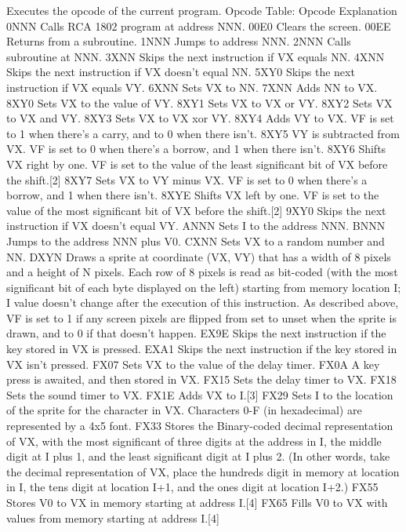 Executes the opcode of the current program. Opcode Table\-: Opcode Explanation 0\-N\-N\-N Calls R\-C\-A 1802 program at address N\-N\-N. 00\-E0 Clears the screen. 00\-E\-E Returns from a subroutine. 1\-N\-N\-N Jumps to address N\-N\-N. 2\-N\-N\-N Calls subroutine at N\-N\-N. 3\-X\-N\-N Skips the next instruction if V\-X equals N\-N. 4\-X\-N\-N Skips the next instruction if V\-X doesn't equal N\-N. 5\-X\-Y0 Skips the next instruction if V\-X equals V\-Y. 6\-X\-N\-N Sets V\-X to N\-N. 7\-X\-N\-N Adds N\-N to V\-X. 8\-X\-Y0 Sets V\-X to the value of V\-Y. 8\-X\-Y1 Sets V\-X to V\-X or V\-Y. 8\-X\-Y2 Sets V\-X to V\-X and V\-Y. 8\-X\-Y3 Sets V\-X to V\-X xor V\-Y. 8\-X\-Y4 Adds V\-Y to V\-X. V\-F is set to 1 when there's a carry, and to 0 when there isn't. 8\-X\-Y5 V\-Y is subtracted from V\-X. V\-F is set to 0 when there's a borrow, and 1 when there isn't. 8\-X\-Y6 Shifts V\-X right by one. V\-F is set to the value of the least significant bit of V\-X before the shift.\mbox{[}2\mbox{]} 8\-X\-Y7 Sets V\-X to V\-Y minus V\-X. V\-F is set to 0 when there's a borrow, and 1 when there isn't. 8\-X\-Y\-E Shifts V\-X left by one. V\-F is set to the value of the most significant bit of V\-X before the shift.\mbox{[}2\mbox{]} 9\-X\-Y0 Skips the next instruction if V\-X doesn't equal V\-Y. A\-N\-N\-N Sets I to the address N\-N\-N. B\-N\-N\-N Jumps to the address N\-N\-N plus V0. C\-X\-N\-N Sets V\-X to a random number and N\-N. D\-X\-Y\-N Draws a sprite at coordinate (V\-X, V\-Y) that has a width of 8 pixels and a height of N pixels. Each row of 8 pixels is read as bit-\/coded (with the most significant bit of each byte displayed on the left) starting from memory location I; I value doesn't change after the execution of this instruction. As described above, V\-F is set to 1 if any screen pixels are flipped from set to unset when the sprite is drawn, and to 0 if that doesn't happen. E\-X9\-E Skips the next instruction if the key stored in V\-X is pressed. E\-X\-A1 Skips the next instruction if the key stored in V\-X isn't pressed. F\-X07 Sets V\-X to the value of the delay timer. F\-X0\-A A key press is awaited, and then stored in V\-X. F\-X15 Sets the delay timer to V\-X. F\-X18 Sets the sound timer to V\-X. F\-X1\-E Adds V\-X to I.\mbox{[}3\mbox{]} F\-X29 Sets I to the location of the sprite for the character in V\-X. Characters 0-\/\-F (in hexadecimal) are represented by a 4x5 font. F\-X33 Stores the Binary-\/coded decimal representation of V\-X, with the most significant of three digits at the address in I, the middle digit at I plus 1, and the least significant digit at I plus 2. (In other words, take the decimal representation of V\-X, place the hundreds digit in memory at location in I, the tens digit at location I+1, and the ones digit at location I+2.) F\-X55 Stores V0 to V\-X in memory starting at address I.\mbox{[}4\mbox{]} F\-X65 Fills V0 to V\-X with values from memory starting at address I.\mbox{[}4\mbox{]} \hypertarget{classCPU_a68658621a98bf997bfd736c9c64f3fac}{
}
